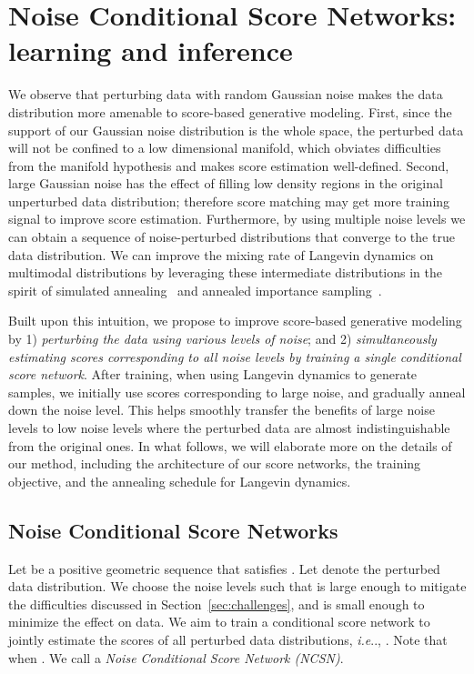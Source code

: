 \documentclass{article}
\makeatletter
\def\@onedot{\ifx\@let@token.\else.\null\fi\xspace}
\DeclareRobustCommand\onedot{\futurelet\@let@token\@onedot}
\newcommand{\secref}[1]{Section~\ref{#1}}
\def\ie{\emph{i.e}\onedot}
\makeatother
\begin{document}
 \section{Noise Conditional Score Networks: learning and inference}
We observe that perturbing data with random Gaussian noise makes the data distribution more amenable to score-based generative modeling. First, since the support of our Gaussian noise distribution is the whole space, the perturbed data will not be confined to a low dimensional manifold, which obviates difficulties from the manifold hypothesis and makes score estimation well-defined. Second, large Gaussian noise has the effect of filling low density regions in the original unperturbed data distribution; therefore score matching may get more training signal to improve score estimation. Furthermore, by using multiple noise levels we can obtain a sequence of noise-perturbed distributions that converge to the true data distribution. We can improve the mixing rate of Langevin dynamics on multimodal distributions by leveraging these intermediate distributions in the spirit of simulated annealing~\cite{kirkpatrick83optimizationby} and annealed importance sampling~\cite{neal2001annealed}.

Built upon this intuition, we propose to improve score-based generative modeling by 1) \emph{perturbing the data using various levels of noise}; and 2) \emph{simultaneously estimating scores corresponding to all noise levels by training a single conditional score network}. After training, when using Langevin dynamics to generate samples, we initially use scores corresponding to 
large noise, and gradually anneal down the noise level. This helps smoothly transfer the benefits of large noise levels to low noise levels where the perturbed data are almost indistinguishable from the original ones. In what follows, we will elaborate more on the details of our method, including the architecture of our score networks, the training objective, and the annealing schedule for Langevin dynamics.



\subsection{Noise Conditional Score Networks}
Let  be a positive geometric sequence that satisfies . Let  denote the perturbed data distribution. We choose the noise levels  such that  is large enough to mitigate the difficulties discussed in \secref{sec:challenges}, and  is small enough to minimize the effect on data. We aim to train a conditional score network to jointly estimate the scores of all perturbed data distributions, \ie, . Note that  when . We call  a \textit{Noise Conditional Score Network (NCSN)}.
\end{document}
